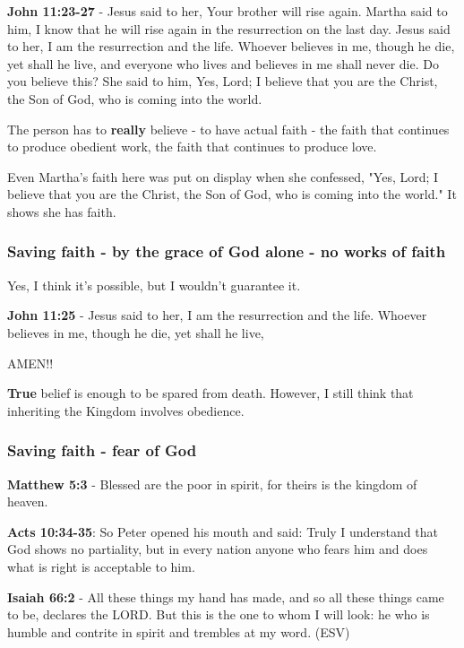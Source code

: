 \documentclass[11pt]{article}
\begin{document}
\textbf{John 11:23-27} - Jesus said to her, Your brother will rise again.  Martha said to him, I know that he will rise again in the resurrection on the last day.  Jesus said to her, I am the resurrection and the life. Whoever believes in me, though he die, yet shall he live, and everyone who lives and believes in me shall never die. Do you believe this?  She said to him, Yes, Lord; I believe that you are the Christ, the Son of God, who is coming into the world.

The person has to \textbf{really} believe - to have actual faith - the faith that continues to produce obedient work, the faith that continues to produce love.

Even Martha's faith here was put on display when she confessed,
"Yes, Lord; I believe that you are the Christ, the Son of God, who is coming into the world."
It shows she has faith.

\subsubsection{Saving faith - by the grace of God alone - no works of faith}
\label{sec:orgb37754a}
Yes, I think it's possible, but I wouldn't guarantee it.

\textbf{John 11:25} - Jesus said to her, I am the resurrection and the life. Whoever believes in me, though he die, yet shall he live,

AMEN!!

\textbf{True} belief is enough to be spared from death.
However, I still think that inheriting the Kingdom involves obedience.

\subsubsection{Saving faith - fear of God}
\label{sec:org9d3c515}
\textbf{Matthew 5:3} - Blessed are the poor in spirit, for theirs is the kingdom of heaven.

\textbf{Acts 10:34-35}: So Peter opened his mouth and said: Truly I understand that God shows no partiality, but in every nation anyone who fears him and does what is right is acceptable to him.

\textbf{Isaiah 66:2} - All these things my hand has made, and so all these things came to be, declares the LORD. But this is the one to whom I will look: he who is humble and contrite in spirit and trembles at my word. (ESV)
\end{document}
